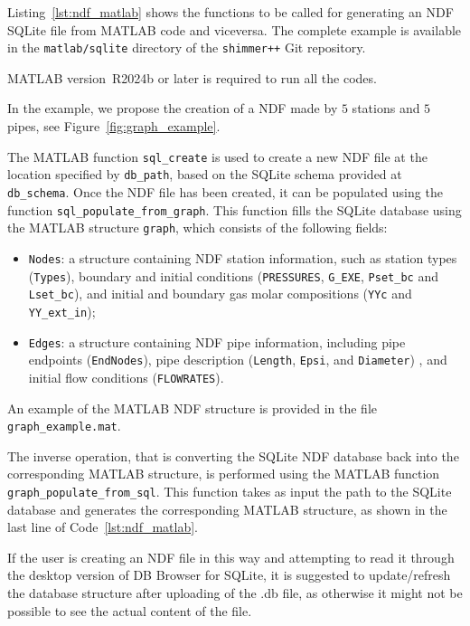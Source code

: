 Listing~\ref{lst:ndf_matlab} shows the functions to be called for generating an NDF SQLite file from MATLAB code and viceversa.
The complete example is available in the \texttt{matlab/sqlite} directory of the \texttt{shimmer++} Git repository.
\begin{remark}
MATLAB version~R2024b or later is required to run all the codes.
\end{remark}

In the example, we propose the creation of a NDF made by $5$ stations and $5$ pipes, see Figure~\ref{fig:graph_example}.

The MATLAB function \texttt{sql\_create} is used to create a new NDF file at the location specified by \texttt{db\_path}, based on the SQLite schema provided at \texttt{db\_schema}.  
Once the NDF file has been created, it can be populated using the function \texttt{sql\_populate\_from\_graph}.  
This function fills the SQLite database using the MATLAB structure \texttt{graph}, which consists of the following fields:

\begin{itemize}
    \item \texttt{Nodes}: a structure containing NDF station information, such as station types (\texttt{Types}), boundary and initial conditions (\texttt{PRESSURES}, \texttt{G\_EXE}, \texttt{Pset\_bc} and \texttt{Lset\_bc}), and initial and boundary gas molar compositions (\texttt{YYc} and \texttt{YY\_ext\_in});
    \item \texttt{Edges}: a structure containing NDF pipe information, including pipe endpoints (\texttt{EndNodes}), pipe description (\texttt{Length}, \texttt{Epsi}, and \texttt{Diameter}) , and initial flow conditions (\texttt{FLOWRATES}).
\end{itemize}

An example of the MATLAB NDF structure is provided in the file \texttt{graph\_example.mat}.

The inverse operation, that is converting the SQLite NDF database back into the corresponding MATLAB structure, is performed using the MATLAB function \texttt{graph\_populate\_from\_sql}.  
This function takes as input the path to the SQLite database and generates the corresponding MATLAB structure, as shown in the last line of Code~\ref{lst:ndf_matlab}.

\begin{remark}
If the user is creating an NDF file in this way and attempting to read it through the desktop version of DB Browser for SQLite, it is suggested to update/refresh the database structure after uploading of the .db file, as otherwise it might not be possible to see the actual content of the file.
\end{remark}